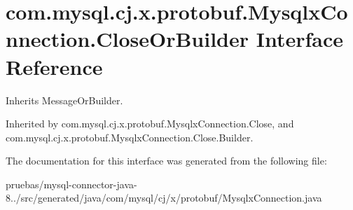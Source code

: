 \hypertarget{interfacecom_1_1mysql_1_1cj_1_1x_1_1protobuf_1_1_mysqlx_connection_1_1_close_or_builder}{}\section{com.\+mysql.\+cj.\+x.\+protobuf.\+Mysqlx\+Connection.\+Close\+Or\+Builder Interface Reference}
\label{interfacecom_1_1mysql_1_1cj_1_1x_1_1protobuf_1_1_mysqlx_connection_1_1_close_or_builder}


Inherits Message\+Or\+Builder.



Inherited by com.\+mysql.\+cj.\+x.\+protobuf.\+Mysqlx\+Connection.\+Close, and com.\+mysql.\+cj.\+x.\+protobuf.\+Mysqlx\+Connection.\+Close.\+Builder.



The documentation for this interface was generated from the following file\+:\begin{DoxyCompactItemize}
\item 
pruebas/mysql-\/connector-\/java-\/8../src/generated/java/com/mysql/cj/x/protobuf/Mysqlx\+Connection.\+java\end{DoxyCompactItemize}
